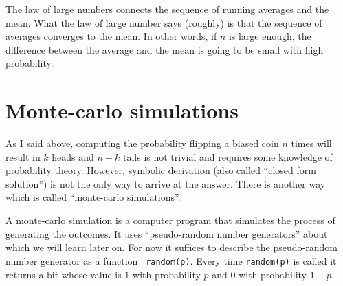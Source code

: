 \documentclass{report}
\theoremstyle{plain}
\theoremstyle{definition}
\begin{document}
The law of large numbers connects the sequence of running averages and
the mean. What the law of large number says (roughly) is that the
sequence of averages converges to the mean. In other words, if $n$ is
large enough, the difference between the average and the mean is going
to be small with high probability.

\section{Monte-carlo simulations}
As I said above, computing the probability flipping a biased coin $n$
times will result in $k$ heads and $n-k$ tails is not
trivial and requires some knowledge of probability theory. However,
symbolic derivation (also called ``closed form solution'') is not the
only way to arrive at the answer. There is another way which is called
``monte-carlo simulations''.

A monte-carlo simulation is a computer program that simulates the
process of generating the outcomes. It uses ``pseudo-random number
generators'' about which we will learn later on. For now it suffices
to describe the pseudo-random number generator as a function {\tt
  random(p)}. Every time {\tt random(p)} is called it returns a bit
whose value is $1$ with probability $p$ and $0$ with probability
$1-p$.
\end{document}
